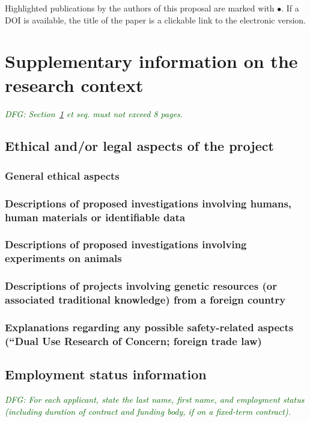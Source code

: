 \documentclass[a4paper,11pt]{amsart}
\theoremstyle{definition}
\newcommand{\<}{\langle}
\renewcommand{\>}{\rangle}
\newcommand{\dfg}[1]{\emph{\textcolor{darkgreen}{DFG: #1}}}
\begin{document}
Highlighted publications by the authors of this proposal are marked
with $\bullet$.  If a DOI is available, the title of the paper is a
clickable link to the electronic version.

\medskip
\printbibliography[heading=none]


\section{Supplementary information on the research context}
\label{sec:suppl}
\dfg{Section~\ref{sec:suppl} et seq. must not exceed 8 pages.}

\subsection{Ethical and/or legal aspects of the project}
\subsubsection{General ethical aspects}
\subsubsection{Descriptions of proposed investigations involving humans, human materials or identifiable data}
\subsubsection{Descriptions of proposed investigations involving experiments on animals}
\subsubsection{Descriptions of projects involving genetic resources (or associated traditional knowledge) from a foreign country}
\subsubsection{Explanations regarding any possible safety-related aspects (“Dual Use Research of Concern; foreign trade law)}

\subsection{Employment status information}

\dfg{For each applicant, state the last name, first name, and
  employment status (including duration of contract and funding body,
  if on a fixed-term contract).}
\end{document}
